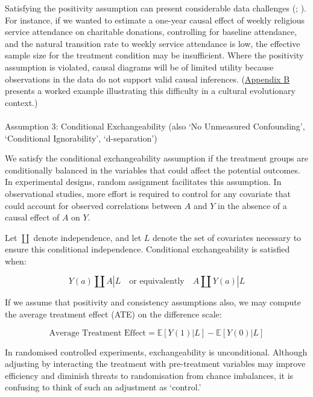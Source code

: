 \documentclass[
  single column]{article}
\makeatletter
\let\oldparagraph\paragraph
\renewcommand{\paragraph}{
    \@ifstar
      \xxxParagraphStar
      \xxxParagraphNoStar
  }
\newcommand{\xxxParagraphStar}[1]{\oldparagraph*{#1}\mbox{}}
\newcommand{\xxxParagraphNoStar}[1]{\oldparagraph{#1}\mbox{}}
\makeatother
\begin{document}
Satisfying the positivity assumption can present considerable data
challenges (;
). For instance, if
we wanted to estimate a one-year causal effect of weekly religious
service attendance on charitable donations, controlling for baseline
attendance, and the natural transition rate to weekly service attendance
is low, the effective sample size for the treatment condition may be
insufficient. Where the positivity assumption is violated, causal
diagrams will be of limited utility because observations in the data do
not support valid causal inferences. (\hyperref[id-app-b]{Appendix B}
presents a worked example illustrating this difficulty in a cultural
evolutionary context.)

\paragraph{Assumption 3: Conditional Exchangeability (also `No
Unmeasured Confounding', `Conditional Ignorability',
`d-separation')}\label{assumption-3-conditional-exchangeability-also-no-unmeasured-confounding-conditional-ignorability-d-separation}

We satisfy the conditional exchangeability assumption if the treatment
groups are conditionally balanced in the variables that could affect the
potential outcomes. In experimental designs, random assignment
facilitates this assumption. In observational studies, more effort is
required to control for any covariate that could account for observed
correlations between \(A\) and \(Y\) in the absence of a causal effect
of \(A\) on \(Y\).

Let \(\coprod\) denote independence, and let \(L\) denote the set of
covariates necessary to ensure this conditional independence.
Conditional exchangeability is satisfied when:

\[
Y(a) \coprod A | L \quad \text{or equivalently} \quad A \coprod Y(a) | L
\]

If we assume that positivity and consistency assumptions also, we may
compute the average treatment effect (ATE) on the difference scale:

\[
\text{Average Treatment Effect} = \mathbb{E}[Y(1) | L] - \mathbb{E}[Y(0) | L]
\]

In randomised controlled experiments, exchangeability is unconditional.
Although adjusting by interacting the treatment with pre-treatment
variables may improve efficiency and diminish threats to randomisation
from chance imbalances, it is confusing to think of such an adjustment
as `control.'
\end{document}
